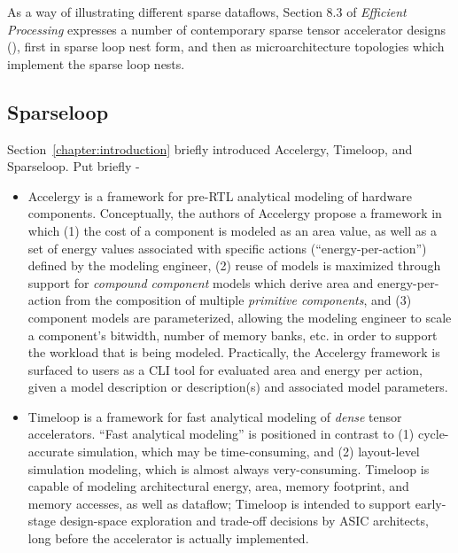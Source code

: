 As a way of illustrating different sparse dataflows, Section 8.3 of \textit{Efficient Processing} expresses a number of contemporary sparse tensor accelerator designs (\cite{cambricon_x}\cite{cnvlutin}\cite{scnn}\cite{sparten}\cite{eyerissv2}\cite{eie}\cite{extensor}), first in sparse loop nest form, and then as microarchitecture topologies which implement the sparse loop nests.


\subsection{Sparseloop}

Section~\ref{chapter:introduction} briefly introduced Accelergy\cite{accelergy}, Timeloop\cite{timeloop}, and Sparseloop\cite{sparseloop}. Put briefly -

\begin{itemize}
    \item Accelergy\cite{accelergy} is a framework for pre-RTL analytical modeling of hardware components. Conceptually, the authors of Accelergy propose a framework in which (1) the cost of a component is modeled as an area value, as well as a set of energy values associated with specific actions (``energy-per-action'') defined by the modeling engineer, (2) reuse of models is maximized through support for \textit{compound component} models which derive area and energy-per-action from the composition of multiple \textit{primitive components}, and (3) component models are parameterized, allowing the modeling engineer to scale a component's bitwidth, number of memory banks, etc. in order to support the workload that is being modeled. Practically, the Accelergy framework is surfaced to users as a CLI tool for evaluated area and energy per action, given a model description or description(s) and associated model parameters.
    \item Timeloop\cite{timeloop} is a framework for fast analytical modeling of \textit{dense} tensor accelerators. ``Fast analytical modeling'' is positioned in contrast to (1) cycle-accurate simulation, which may be time-consuming, and (2) layout-level simulation modeling, which is almost always very-consuming\cite{wattch}. Timeloop is capable of modeling architectural energy, area, memory footprint, and memory accesses, as well as dataflow\cite{timeloop}; Timeloop is intended to support early-stage design-space exploration and trade-off decisions by ASIC architects, long before the accelerator is actually implemented.
\end{itemize}

